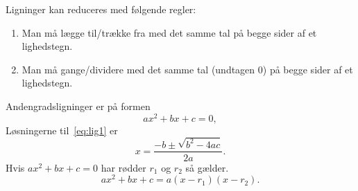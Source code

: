Ligninger kan reduceres med følgende regler:
\begin{enumerate}
	\item Man må lægge til/trække fra med det samme tal på begge sider af et lighedstegn.
	\item Man må gange/dividere med det samme tal (undtagen 0) på begge sider af et lighedstegn.
\end{enumerate}
Andengradsligninger er på formen
\begin{equation}\label{eq:lig1}
ax^2+bx+c=0,
\end{equation}
Løsningerne til~\eqref{eq:lig1} er
\begin{equation*}
x=\frac{-b\pm \sqrt{b^2-4ac}}{2a}.
\end{equation*}
Hvis $ax^2+bx+c=0$ har rødder $r_1$ og $r_2$ så gælder.
\begin{equation*}
ax^2+bx+c=a(x-r_1)(x-r_2).
\end{equation*}